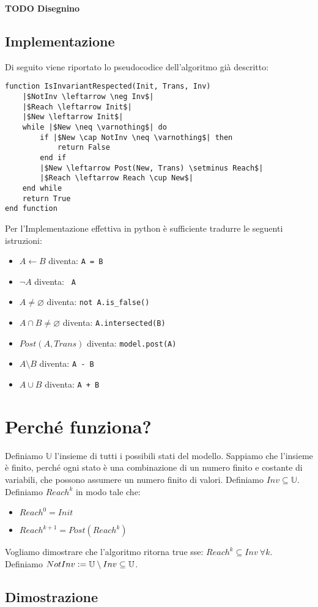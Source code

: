 \documentclass[12pt]{article}
\begin{document}
    \textbf{TODO Disegnino}

    \subsection{Implementazione}
    Di seguito viene riportato lo pseudocodice dell'algoritmo già descritto:

    \begin{verbatim}
function IsInvariantRespected(Init, Trans, Inv)
    |$NotInv \leftarrow \neg Inv$|
    |$Reach \leftarrow Init$|
    |$New \leftarrow Init$|
    while |$New \neq \varnothing$| do
        if |$New \cap NotInv \neq \varnothing$| then
            return False
        end if
        |$New \leftarrow Post(New, Trans) \setminus Reach$|
        |$Reach \leftarrow Reach \cup New$|
    end while
    return True
end function
    \end{verbatim}

    Per l'Implementazione effettiva in python è sufficiente tradurre le seguenti istruzioni:
    \begin{itemize}
        \item $A \leftarrow B$ diventa: \texttt{A = B}
        \item $\neg A$ diventa: \texttt{~A}
        \item $A \neq \varnothing$ diventa: \texttt{not A.is_false()}
        \item $A \cap B \neq \varnothing$ diventa: \texttt{A.intersected(B)}
        \item $Post(A, Trans)$ diventa: \texttt{model.post(A)}
        \item $A \setminus B$ diventa: \texttt{A - B}
        \item $A \cup B$ diventa: \texttt{A + B}
    \end{itemize}


    
    \section{Perché funziona?}
    Definiamo $\mathbb U$ l'insieme di tutti i possibili stati del modello. Sappiamo che l'insieme è finito, perché ogni stato è una combinazione di un numero finito e costante di variabili, che possono assumere un numero finito di valori.
    Definiamo $Inv \subseteq \mathbb U$.
    Definiamo $Reach^k$ in modo tale che:
    \begin{itemize}
        \item $Reach^0 = Init$
        \item $Reach^{k + 1} = Post(Reach^k)$
    \end{itemize}

    Vogliamo dimostrare che l'algoritmo ritorna true sse: $Reach^k \subseteq Inv\ \forall k$.
    Definiamo $NotInv \vcentcolon= \mathbb U \setminus Inv \subseteq \mathbb U$.

    \subsection{Dimostrazione}
\end{document}
